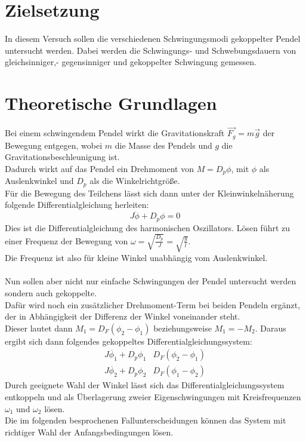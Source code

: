 \section{Zielsetzung}

In diesem Versuch sollen die verschiedenen Schwingungsmodi gekoppelter Pendel untersucht werden.
Dabei werden die Schwingungs- und Schwebungsdauern von gleichsinniger,- gegensinniger und gekoppelter Schwingung gemessen.

\section{Theoretische Grundlagen}

Bei einem schwingendem Pendel wirkt die Gravitationskraft $\vec{F_g}=m \vec{g} $ der Bewegung entgegen, wobei $m$ die Masse des Pendels und $g$ die Gravitationsbeschleunigung ist.\\
Dadurch wirkt auf das Pendel ein Drehmoment von $M= D_p\phi$,  mit $\phi$ als Auslenkwinkel und $D_p$ als die Winkelrichtgröße.\\
Für die Bewegung des Teilchens lässt sich dann unter der Kleinwinkelnäherung folgende Differentialgleichung herleiten:
\begin{equation*}
    J \ddot{\phi} + D_p \phi=0
\end{equation*}
Dies ist die Differentialgleichung des harmonischen Oszillators. Lösen führt zu einer Frequenz der Bewegung von $\omega= \sqrt{\frac{D_p}{J}}=\sqrt{\frac{g}{l}}$.\\
Die Frequenz ist also für kleine Winkel unabhängig vom Auslenkwinkel.\\\\

\noindent
Nun sollen aber nicht nur einfache Schwingungen der Pendel untersucht werden sondern auch gekoppelte.\\
Dafür wird noch ein zusätzlicher Drehmoment-Term bei beiden Pendeln ergänzt, der in Abhängigkeit der Differenz der Winkel voneinander steht.\\
Dieser lautet dann $M_1=D_F (\phi_2 -\phi_1)$ beziehungsweise $M_1=-M_2$.
Daraus ergibt sich dann folgendes gekoppeltes Differentialgleichungssystem:
\begin{align*}
    J \ddot{\phi_1} + D_p \phi_1 & D_F (\phi_2 -\phi_1)\\
    J \ddot{\phi_2} + D_p \phi_2 & D_F (\phi_1 -\phi_2)
\end{align*}
Durch geeignete Wahl der Winkel lässt sich das Differentialgleichungssystem entkoppeln und als Überlagerung zweier Eigenschwingungen mit Kreisfrequenzen $\omega_1$ und $\omega_2$ lösen.\\
Die im folgenden besprochenen Fallunterscheidungen können das System mit richtiger Wahl der Anfangsbedingungen lösen.

